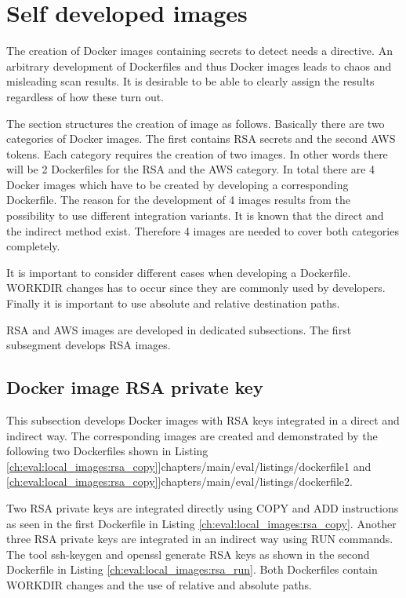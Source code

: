 \section{Self developed images}
\label{ch:eval:local_images}
The creation of Docker images containing secrets to detect needs a directive. 
An arbitrary development of Dockerfiles and thus Docker images leads to chaos and misleading scan results. 
It is desirable to be able to clearly assign the results regardless of how these turn out.

The section structures the creation of image as follows. 
Basically there are two categories of Docker images. 
The first contains RSA secrets and the second AWS tokens. 
Each category requires the creation of two images. 
In other words there will be 2 Dockerfiles for the RSA and the AWS category. 
In total there are 4 Docker images which have to be created by developing a corresponding Dockerfile. 
The reason for the development of 4 images results from the possibility to use different integration variants.
It is known that the direct and the indirect method exist. 
Therefore 4 images are needed to cover both categories completely.

It is important to consider different cases when developing a Dockerfile. 
WORKDIR changes has to occur since they are commonly used by developers. 
Finally it is important to use absolute and relative destination paths. 

RSA and AWS images are developed in dedicated subsections. 
The first subsegment develops RSA images.

\subsection{Docker image RSA private key}
\label{ch:eval:local_images:rsa}
This subsection develops Docker images with RSA keys integrated in a direct and indirect way. 
The corresponding images are created and demonstrated by the following two Dockerfiles shown in Listing \ref{ch:eval:local_images:rsa_copy}]{chapters/main/eval/listings/dockerfile1} and \ref{ch:eval:local_images:rsa_copy}]{chapters/main/eval/listings/dockerfile2}.


Two RSA private keys are integrated directly using COPY and ADD instructions as seen in the first Dockerfile in Listing \ref{ch:eval:local_images:rsa_copy}. 
Another three RSA private keys are integrated in an indirect way using RUN commands. 
The tool ssh-keygen and openssl generate RSA keys as shown in the second Dockerfile in Listing \ref{ch:eval:local_images:rsa_run}. 
Both Dockerfiles contain WORKDIR changes and the use of relative and absolute paths. 

